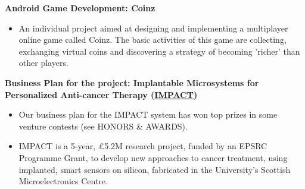 \documentclass[%
               doublesided,
               paper=a4,
               fontsize=11pt
              ]{my-resume}
\begin{document}
\textbf{Android Game Development: Coinz}
\smallskip
\begin{itemize}
    \item An individual project aimed at designing and implementing a multiplayer online game called Coinz.   The  basic  activities  of  this  game  are  collecting,  exchanging  virtual  coins  and  discovering  a strategy of becoming ’richer’ than other players.
\end{itemize}
\divider

\textbf{Business Plan for the project: Implantable Microsystems for Personalized Anti-cancer Therapy (\href{https://www.eng.ed.ac.uk/research/projects/impact-implantable-microsystems-personalised-anti-cancer-therapy}{IMPACT})}
\smallskip
\begin{itemize}
    \item Our business plan for the IMPACT system has won top prizes in some venture contests (see HONORS \& AWARDS).
    \item IMPACT is a 5-year, £5.2M research project, funded by an EPSRC Programme Grant, to develop new approaches to cancer treatment, using implanted, smart sensors on silicon, fabricated in the University's Scottish Microelectronics Centre.
\end{itemize}
\divider


    

    
\end{document}
